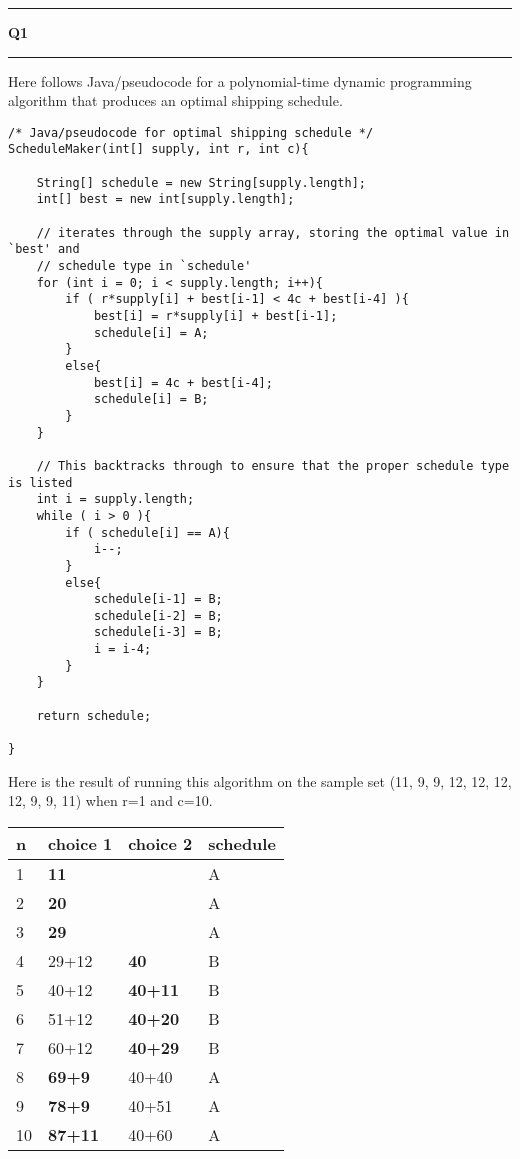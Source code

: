 \documentclass[11pt]{article}
\newcommand\question[2]{\vspace{.25in}\hrule\textbf{#1 #2}\vspace{.5em}\hrule\vspace{.10in}}
\begin{document}
\raggedright
\newcommand\NAME{Sean Connor (443-414-5111)}  %
\newcommand\HWNUM{6}              %
\question{Q1}{}
Here follows Java/pseudocode for a polynomial-time dynamic programming algorithm that produces an optimal shipping schedule.
\begin{lstlisting}
/* Java/pseudocode for optimal shipping schedule */
ScheduleMaker(int[] supply, int r, int c){
	
	String[] schedule = new String[supply.length];
	int[] best = new int[supply.length];
	
	// iterates through the supply array, storing the optimal value in `best' and 
	// schedule type in `schedule'
	for (int i = 0; i < supply.length; i++){
		if ( r*supply[i] + best[i-1] < 4c + best[i-4] ){
			best[i] = r*supply[i] + best[i-1];
			schedule[i] = A;
		}
		else{
			best[i] = 4c + best[i-4];
			schedule[i] = B;
		}
	}
			
	// This backtracks through to ensure that the proper schedule type is listed
	int i = supply.length;
	while ( i > 0 ){
		if ( schedule[i] == A){
			i--;
		}
		else{
			schedule[i-1] = B;
			schedule[i-2] = B;
			schedule[i-3] = B;
			i = i-4;
		}
	}
		
	return schedule;

}
\end{lstlisting}

\pagebreak
Here is the result of running this algorithm on the sample set (11, 9, 9, 12, 12, 12, 12, 9, 9, 11) when r=1 and c=10.

\begin{table}[htbp!]
\centering
\begin{tabular}{l|l|l|l}
n  & choice 1       & choice 2       & schedule \\ \hline
1  & \textbf{11}    &                & A        \\
2  & \textbf{20}    &                & A        \\
3  & \textbf{29}    &                & A        \\
4  & 29+12          & \textbf{40}    & B        \\
5  & 40+12          & \textbf{40+11} & B        \\
6  & 51+12          & \textbf{40+20} & B        \\
7  & 60+12          & \textbf{40+29} & B        \\
8  & \textbf{69+9}  & 40+40          & A        \\
9  & \textbf{78+9}  & 40+51          & A        \\
10 & \textbf{87+11} & 40+60          & A       
\end{tabular}
\end{table}
\end{document}
